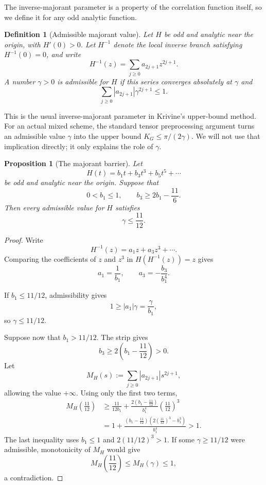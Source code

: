 \documentclass[11pt]{article}
\newtheorem{proposition}[theorem]{Proposition}
\newtheorem{definition}[theorem]{Definition}
\begin{document}
The inverse-majorant parameter is a property of the correlation function itself, so we define it for any odd analytic function.

\begin{definition}[Admissible majorant value]
Let $H$ be odd and analytic near the origin, with $H'(0)>0$.  Let $H^{-1}$ denote the local inverse branch satisfying $H^{-1}(0)=0$, and write
\[
        H^{-1}(z)=\sum_{j\ge0}a_{2j+1}z^{2j+1}.
\]
A number $\gamma>0$ is \emph{admissible} for $H$ if this series converges absolutely at $\gamma$ and
\[
        \sum_{j\ge0}|a_{2j+1}|\gamma^{2j+1}\le1.
\]
\end{definition}

This is the usual inverse-majorant parameter in Krivine's upper-bound method.  For an actual mixed scheme, the standard tensor preprocessing argument turns an admissible value $\gamma$ into the upper bound $K_G\le\pi/(2\gamma)$.  We will not use that implication directly; it only explains the role of $\gamma$.

\begin{proposition}[The majorant barrier]\label{prop:majorant-barrier}
Let
\[
        H(t)=b_1t+b_3t^3+b_5t^5+\cdots
\]
be odd and analytic near the origin.  Suppose that
\[
        0<b_1\le1,
        \qquad
        b_3\ge2b_1-\frac{11}{6}.
\]
Then every admissible value for $H$ satisfies
\[
        \gamma\le\frac{11}{12}.
\]
\end{proposition}

\begin{proof}
Write
\[
        H^{-1}(z)=a_1z+a_3z^3+\cdots.
\]
Comparing the coefficients of $z$ and $z^3$ in $H(H^{-1}(z))=z$ gives
\[
        a_1=\frac1{b_1},
        \qquad
        a_3=-\frac{b_3}{b_1^4}.
\]

If $b_1\le11/12$, admissibility gives
\[
        1\ge |a_1|\gamma=\frac{\gamma}{b_1},
\]
so $\gamma\le11/12$.

Suppose now that $b_1>11/12$.  The strip gives
\[
        b_3\ge2\left(b_1-\frac{11}{12}\right)>0.
\]
Let
\[
        M_H(s):=\sum_{j\ge0}|a_{2j+1}|s^{2j+1},
\]
allowing the value $+\infty$.  Using only the first two terms,
\begin{align*}
        M_H\left(\frac{11}{12}\right)
        &\ge
        \frac{11}{12b_1}
        +\frac{2(b_1-\frac{11}{12})}{b_1^4}
          \left(\frac{11}{12}\right)^3\\
        &=1+
        \frac{(b_1-\frac{11}{12})
        \left(2(\frac{11}{12})^3-b_1^3\right)}{b_1^4}
        >1.
\end{align*}
The last inequality uses $b_1\le1$ and $2(11/12)^3>1$.  If some $\gamma\ge11/12$ were admissible, monotonicity of $M_H$ would give
\[
        M_H\left(\frac{11}{12}\right)\le M_H(\gamma)\le1,
\]
a contradiction.
\end{proof}
\end{document}
